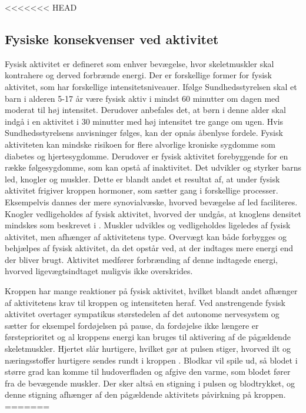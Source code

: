 <<<<<<< HEAD
\subsection{Fysiske konsekvenser ved aktivitet}
Fysisk aktivitet er defineret som enhver bevægelse, hvor skeletmuskler skal kontrahere og derved forbrænde energi. Der er forskellige former for fysisk aktivitet, som har forskellige intensitetsniveauer. \citep{Academic2016a} Ifølge Sundhedsstyrelsen skal et barn i alderen 5-17 år være fysisk aktiv i mindst 60 minutter om dagen med moderat til høj intensitet. Derudover anbefales det, at børn i denne alder skal indgå i en aktivitet i 30 minutter med høj intensitet tre gange om ugen. \citep{Sundhedsstyrelsen2016} Hvis Sundhedsstyrelsens anvisninger følges, kan der opnås åbenlyse fordele. Fysisk aktiviteten kan mindske risikoen for flere alvorlige kroniske sygdomme som diabetes og hjertesygdomme. Derudover er fysisk aktivitet forebyggende for en række følgesygdomme, som kan opstå af inaktivitet. Det udvikler og styrker barns led, knogler og muskler. Dette er blandt andet et resultat af, at under fysisk aktivitet frigiver kroppen hormoner, som sætter gang i forskellige processer. Eksempelvis dannes der mere synovialvæske, hvorved bevægelse af led faciliteres. Knogler vedligeholdes af fysisk aktivitet, hvorved der undgås, at knoglens densitet mindskes som beskrevet i . Muskler udvikles og vedligeholdes ligeledes af fysisk aktivitet, men afhænger af aktivitetens type. Overvægt kan både forbygges og behjælpes af fysisk aktivitet, da det opstår ved, at der indtages mere energi end der bliver brugt. Aktivitet medfører forbrænding af denne indtagede energi, hvorved ligevægtsindtaget muligvis ikke overskrides. \citep{Academic2016a,Smith1991,Academic2016b,Cotman2007,CenterforDiseaseControlandPrevention2015}

Kroppen har mange reaktioner på fysisk aktivitet, hvilket blandt andet afhænger af aktivitetens krav til kroppen og intensiteten heraf. Ved anstrengende fysisk aktivitet overtager sympatikus størstedelen af det autonome nervesystem og sætter for eksempel fordøjelsen på pause, da fordøjelse ikke længere er førsteprioritet og al kroppens energi kan bruges til aktivering af de pågældende skeletmuskler. Hjertet slår hurtigere, hvilket gør at pulsen stiger, hvorved ilt og næringsstoffer hurtigere sendes rundt i kroppen \citep{Hjerteforeningen}. Blodkar vil spile ud, så blodet i større grad kan komme til hudoverfladen og afgive den varme, som blodet fører fra de bevægende muskler. Der sker altså en stigning i pulsen og blodtrykket, og denne stigning afhænger af den pågældende aktivitets påvirkning på kroppen. \citep{Martini2012,Stanfield2013,Berchtold2010}
=======
